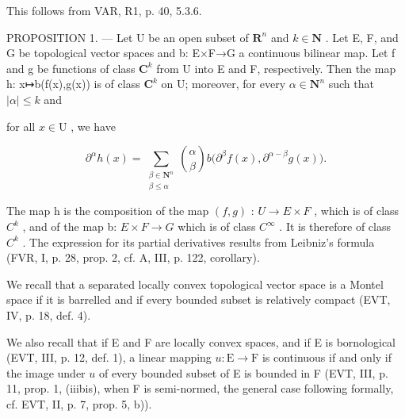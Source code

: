 This follows from VAR, R1, p. 40, 5.3.6.

PROPOSITION 1. --- Let U be an open subset of \(\mathbf{R}^{n}\) and \(k\in\mathbf{N}\) . Let E, F, and G be topological vector spaces and b: E×F→G a continuous bilinear map. Let f and g be functions of class \(\mathbf{C}^{k}\) from U into E and F, respectively. Then the map h: x↦b(f(x),g(x)) is of class \(\mathbf{C}^{k}\) on U; moreover, for every \(\alpha\in\mathbf{N}^{n}\) such that \(|\alpha|\leqslant k\) and

for all \(x \in \mathrm{U}\) , we have

\[
\partial^{\alpha}h(x) = \sum_{\substack{\beta \in \mathbf{N}^{n}\\ \beta \leqslant \alpha}}\binom {\alpha}{\beta}b\big(\partial^{\beta}f(x),\partial^{\alpha -\beta}g(x)\big).
\]

The map h is the composition of the map \((f,g)\) : \(U \rightarrow E \times F\) , which is of class \(C^{k}\) , and of the map b: \(E \times F \rightarrow G\) which is of class \(C^{\infty}\) . It is therefore of class \(C^{k}\) . The expression for its partial derivatives results from Leibniz's formula (FVR, I, p. 28, prop. 2, cf. A, III, p. 122, corollary).

We recall that a separated locally convex topological vector space is a Montel space if it is barrelled and if every bounded subset is relatively compact (EVT, IV, p. 18, def. 4).

We also recall that if E and F are locally convex spaces, and if E is bornological (EVT, III, p. 12, def. 1), a linear mapping \(u\colon\mathrm{E}\to\mathrm{F}\) is continuous if and only if the image under \(u\) of every bounded subset of E is bounded in F (EVT, III, p. 11, prop. 1, (iiibis), when F is semi-normed, the general case following formally, cf. EVT, II, p. 7, prop. 5, b)).


